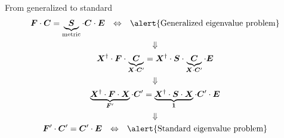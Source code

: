 \documentclass[aspectratio=169,9pt]{beamer}
\newcommand{\bC}{\boldsymbol{C}}
\newcommand{\bE}{\boldsymbol{E}}
\newcommand{\bI}{\boldsymbol{1}}
\newcommand{\bS}{\boldsymbol{S}}
\newcommand{\bF}{\boldsymbol{F}}
\newcommand{\bX}{\boldsymbol{X}}
\begin{document}
\begin{frame}{From generalized to standard}
	\begin{gather*}
		\bF \cdot \bC = \underbrace{\bS}_{\text{metric}} \cdot \bC \cdot \bE
		\qq{$\Leftrightarrow$}
		\text{\alert{Generalized eigenvalue problem}}
		\\
		\Downarrow
		\\
		\bX^\dag \cdot \bF \cdot \underbrace{\bC}_{\bX \cdot \bC'} = \bX^\dag \cdot \bS \cdot \underbrace{\bC}_{\bX \cdot \bC'} \cdot \bE
		\\
		\Downarrow
		\\
		\underbrace{\bX^\dag \cdot \bF \cdot \bX}_{\bF'} \cdot \bC' = \underbrace{\bX^\dag \cdot \bS \cdot \bX}_{\bI} \cdot \bC' \cdot \bE
		\\
		\Downarrow
		\\
		\bF' \cdot \bC' = \bC' \cdot \bE
		\qq{$\Leftrightarrow$}
		\text{\alert{Standard eigenvalue problem}}	
	\end{gather*}
\end{frame}


\end{document}
